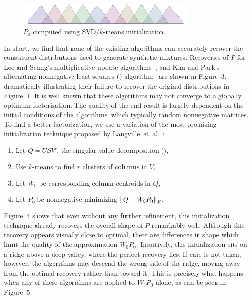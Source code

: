 \documentclass[conference]{IEEEtran}
\begin{document}
\begin{figure}[t]
\begin{center}
\includegraphics[width=3.5in]{synth/Q_ki}
\end{center}
\vspace{-0.7em}
\caption{$P_0$ computed using SVD/$k$-means initialization.}
\vspace{-1em}
\end{figure}

In short, we find that none of the existing  algorithms can accurately recover the constituent distributions used to generate synthetic mixtures.
Recoveries of $P$ for Lee and Seung's multiplicative update algorithms~\cite{Lee01}, and Kim and Park's alternating nonnegative least squares () algorithm~\cite{Kim08} are shown in Figure~3, dramatically illustrating their failure to recover the original distributions in Figure~1.
It is well known that these algorithms may not converge to a globally optimum factorization.
The quality of the end result is largely dependent on the initial conditions of the algorithms, which typically random nonnegative matrices.
To find a better factorization, we use a variation of the most promising initialization technique proposed by Langville~et~al.~\cite{Langville07}:
\begin{enumerate}
  \item Let $Q=USV'$, the singular value decomposition (),
  \item Use $k$-means to find $r$ clusters of columns in $V$,
  \item Let $W_0$ be corresponding column centroids in $Q$,
  \item Let $P_0$ be nonnegative minimizing ${\lVert Q - W_0 P_0\rVert}_F$.
\end{enumerate}
Figure~4 shows that even without any further refinement, this initialization technique already recovers the overall shape of $P$ remarkably well.
Although this recovery appears visually close to optimal, there are differences in shape which limit the quality of the approximation $W_0 P_0$.
Intuitively, this initialization sits on a ridge above a deep valley, where the perfect recovery lies.
If care is not taken, however, the  algorithms may descend the wrong side of the ridge, moving away from the optimal recovery rather than toward it.
This is precisely what happens when any of these algorithms are applied to $W_0 P_0$ alone, as can be seen in Figure~5.
\end{document}
